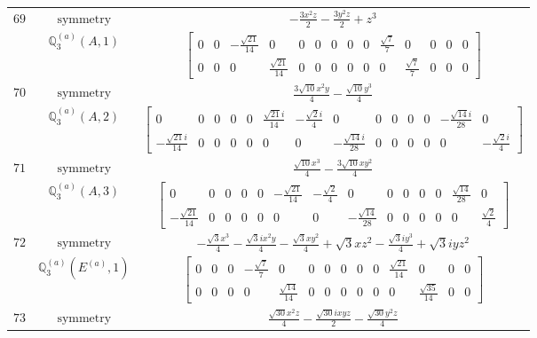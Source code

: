\documentclass[fleqn,8pt,landscape]{jsarticle}
\begin{document}
\begin{longtable}{ccc}
$ 69 $ & $ \text{symmetry} $ & $ - \frac{3 x^{2} z}{2} - \frac{3 y^{2} z}{2} + z^{3} $ \\
$  $ & $ \mathbb{Q}_{3}^{(a)}(A,1) $ & $ \begin{bmatrix} 0 & 0 & - \frac{\sqrt{21}}{14} & 0 & 0 & 0 & 0 & 0 & 0 & \frac{\sqrt{7}}{7} & 0 & 0 & 0 & 0 \\ 0 & 0 & 0 & \frac{\sqrt{21}}{14} & 0 & 0 & 0 & 0 & 0 & 0 & \frac{\sqrt{7}}{7} & 0 & 0 & 0 \end{bmatrix} $ \\ \hline
$ 70 $ & $ \text{symmetry} $ & $ \frac{3 \sqrt{10} x^{2} y}{4} - \frac{\sqrt{10} y^{3}}{4} $ \\
$  $ & $ \mathbb{Q}_{3}^{(a)}(A,2) $ & $ \begin{bmatrix} 0 & 0 & 0 & 0 & 0 & \frac{\sqrt{21} i}{14} & - \frac{\sqrt{2} i}{4} & 0 & 0 & 0 & 0 & 0 & - \frac{\sqrt{14} i}{28} & 0 \\ - \frac{\sqrt{21} i}{14} & 0 & 0 & 0 & 0 & 0 & 0 & - \frac{\sqrt{14} i}{28} & 0 & 0 & 0 & 0 & 0 & - \frac{\sqrt{2} i}{4} \end{bmatrix} $ \\ \hline
$ 71 $ & $ \text{symmetry} $ & $ \frac{\sqrt{10} x^{3}}{4} - \frac{3 \sqrt{10} x y^{2}}{4} $ \\
$  $ & $ \mathbb{Q}_{3}^{(a)}(A,3) $ & $ \begin{bmatrix} 0 & 0 & 0 & 0 & 0 & - \frac{\sqrt{21}}{14} & - \frac{\sqrt{2}}{4} & 0 & 0 & 0 & 0 & 0 & \frac{\sqrt{14}}{28} & 0 \\ - \frac{\sqrt{21}}{14} & 0 & 0 & 0 & 0 & 0 & 0 & - \frac{\sqrt{14}}{28} & 0 & 0 & 0 & 0 & 0 & \frac{\sqrt{2}}{4} \end{bmatrix} $ \\ \hline
$ 72 $ & $ \text{symmetry} $ & $ - \frac{\sqrt{3} x^{3}}{4} - \frac{\sqrt{3} i x^{2} y}{4} - \frac{\sqrt{3} x y^{2}}{4} + \sqrt{3} x z^{2} - \frac{\sqrt{3} i y^{3}}{4} + \sqrt{3} i y z^{2} $ \\
$  $ & $ \mathbb{Q}_{3}^{(a)}(E^{(a)},1) $ & $ \begin{bmatrix} 0 & 0 & 0 & - \frac{\sqrt{7}}{7} & 0 & 0 & 0 & 0 & 0 & 0 & \frac{\sqrt{21}}{14} & 0 & 0 & 0 \\ 0 & 0 & 0 & 0 & \frac{\sqrt{14}}{14} & 0 & 0 & 0 & 0 & 0 & 0 & \frac{\sqrt{35}}{14} & 0 & 0 \end{bmatrix} $ \\ \hline
$ 73 $ & $ \text{symmetry} $ & $ \frac{\sqrt{30} x^{2} z}{4} - \frac{\sqrt{30} i x y z}{2} - \frac{\sqrt{30} y^{2} z}{4} $ \\

\end{longtable}
\end{document}
